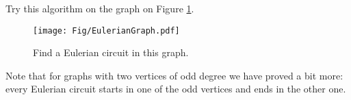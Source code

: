 Try this algorithm on the graph on Figure \ref{fig:EulerianGraph}.

\begin{figure}[h]
\begin{center}
\texttt{[image: Fig/EulerianGraph.pdf]}
\end{center}
\caption{Find a Eulerian circuit in this graph.}
\label{fig:EulerianGraph}
\end{figure}

Note that for graphs with two vertices of odd degree we have proved a bit more:
every Eulerian circuit starts in one of the odd vertices and ends in the other one.










